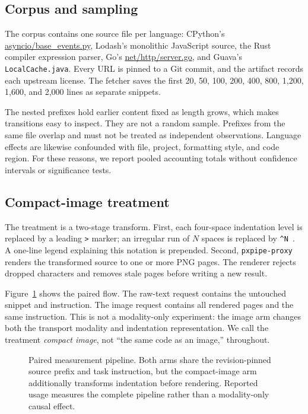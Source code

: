 \documentclass[sigconf,nonacm]{acmart}
\begin{document}
\subsection{Corpus and sampling}

The corpus contains one source file per language: CPython's
\url{asyncio/base_events.py}, Lodash's monolithic JavaScript source, the Rust
compiler expression parser, Go's \url{net/http/server.go}, and Guava's
\texttt{LocalCache.java}. Every URL is pinned to a Git commit, and the artifact
records each upstream license. The fetcher saves the first 20, 50, 100, 200,
400, 800, 1,200, 1,600, and 2,000 lines as separate snippets.

The nested prefixes hold earlier content fixed as length grows, which makes
transitions easy to inspect. They are not a random sample. Prefixes from the same file overlap and
must not be treated as independent observations. Language effects are likewise
confounded with file, project, formatting style, and code region. For these
reasons, we report pooled accounting totals without confidence intervals or
significance tests.

\subsection{Compact-image treatment}

The treatment is a two-stage transform. First, each four-space indentation level
is replaced by a leading \texttt{>} marker; an irregular run of $N$ spaces is
replaced by \texttt{\^{}N }. A one-line legend explaining this notation is
prepended. Second, \texttt{pxpipe-proxy} renders the transformed source to one
or more PNG pages. The renderer rejects dropped characters and removes stale
pages before writing a new result.

Figure~\ref{fig:pipeline} shows the paired flow. The raw-text request contains
the untouched snippet and instruction. The image request contains all rendered
pages and the same instruction. This is not a modality-only
experiment: the image arm changes both the transport modality and indentation
representation. We call the treatment \emph{compact image}, not ``the same code
as an image,'' throughout.

\begin{figure}[t]
  \centering
  
  \caption{Paired measurement pipeline. Both arms share the revision-pinned
  source prefix and task instruction, but the compact-image arm additionally
  transforms indentation before rendering. Reported usage measures
  the complete pipeline rather than a modality-only causal effect.}
  \label{fig:pipeline}
\end{figure}
\end{document}

